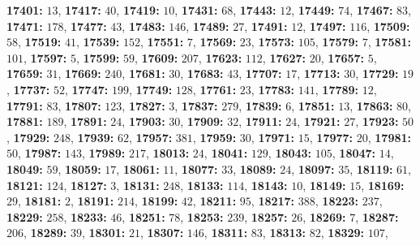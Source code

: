 \textsf{\bfseries 17401:} $13$, \textsf{\bfseries 17417:} $40$, \textsf{\bfseries 17419:} $10$, \textsf{\bfseries 17431:} $68$, \textsf{\bfseries 17443:} $12$, \textsf{\bfseries 17449:} $74$, \textsf{\bfseries 17467:} $83$, \textsf{\bfseries 17471:} $178$, \textsf{\bfseries 17477:} $43$, \textsf{\bfseries 17483:} $146$, \textsf{\bfseries 17489:} $27$, \textsf{\bfseries 17491:} $12$, \textsf{\bfseries 17497:} $116$, \textsf{\bfseries 17509:} $58$, \textsf{\bfseries 17519:} $41$, \textsf{\bfseries 17539:} $152$, \textsf{\bfseries 17551:} $7$, \textsf{\bfseries 17569:} $23$, \textsf{\bfseries 17573:} $105$, \textsf{\bfseries 17579:} $7$, \textsf{\bfseries 17581:} $101$, \textsf{\bfseries 17597:} $5$, \textsf{\bfseries 17599:} $59$, \textsf{\bfseries 17609:} $207$, \textsf{\bfseries 17623:} $112$, \textsf{\bfseries 17627:} $20$, \textsf{\bfseries 17657:} $5$, \textsf{\bfseries 17659:} $31$, \textsf{\bfseries 17669:} $240$, \textsf{\bfseries 17681:} $30$, \textsf{\bfseries 17683:} $43$, \textsf{\bfseries 17707:} $17$, \textsf{\bfseries 17713:} $30$, \textsf{\bfseries 17729:} $19$, \textsf{\bfseries 17737:} $52$, \textsf{\bfseries 17747:} $199$, \textsf{\bfseries 17749:} $128$, \textsf{\bfseries 17761:} $23$, \textsf{\bfseries 17783:} $141$, \textsf{\bfseries 17789:} $12$, \textsf{\bfseries 17791:} $83$, \textsf{\bfseries 17807:} $123$, \textsf{\bfseries 17827:} $3$, \textsf{\bfseries 17837:} $279$, \textsf{\bfseries 17839:} $6$, \textsf{\bfseries 17851:} $13$, \textsf{\bfseries 17863:} $80$, \textsf{\bfseries 17881:} $189$, \textsf{\bfseries 17891:} $24$, \textsf{\bfseries 17903:} $30$, \textsf{\bfseries 17909:} $32$, \textsf{\bfseries 17911:} $24$, \textsf{\bfseries 17921:} $27$, \textsf{\bfseries 17923:} $50$, \textsf{\bfseries 17929:} $248$, \textsf{\bfseries 17939:} $62$, \textsf{\bfseries 17957:} $381$, \textsf{\bfseries 17959:} $30$, \textsf{\bfseries 17971:} $15$, \textsf{\bfseries 17977:} $20$, \textsf{\bfseries 17981:} $50$, \textsf{\bfseries 17987:} $143$, \textsf{\bfseries 17989:} $217$, \textsf{\bfseries 18013:} $24$, \textsf{\bfseries 18041:} $129$, \textsf{\bfseries 18043:} $105$, \textsf{\bfseries 18047:} $14$, \textsf{\bfseries 18049:} $59$, \textsf{\bfseries 18059:} $17$, \textsf{\bfseries 18061:} $11$, \textsf{\bfseries 18077:} $33$, \textsf{\bfseries 18089:} $24$, \textsf{\bfseries 18097:} $35$, \textsf{\bfseries 18119:} $61$, \textsf{\bfseries 18121:} $124$, \textsf{\bfseries 18127:} $3$, \textsf{\bfseries 18131:} $248$, \textsf{\bfseries 18133:} $114$, \textsf{\bfseries 18143:} $10$, \textsf{\bfseries 18149:} $15$, \textsf{\bfseries 18169:} $29$, \textsf{\bfseries 18181:} $2$, \textsf{\bfseries 18191:} $214$, \textsf{\bfseries 18199:} $42$, \textsf{\bfseries 18211:} $95$, \textsf{\bfseries 18217:} $388$, \textsf{\bfseries 18223:} $237$, \textsf{\bfseries 18229:} $258$, \textsf{\bfseries 18233:} $46$, \textsf{\bfseries 18251:} $78$, \textsf{\bfseries 18253:} $239$, \textsf{\bfseries 18257:} $26$, \textsf{\bfseries 18269:} $7$, \textsf{\bfseries 18287:} $206$, \textsf{\bfseries 18289:} $39$, \textsf{\bfseries 18301:} $21$, \textsf{\bfseries 18307:} $146$, \textsf{\bfseries 18311:} $83$, \textsf{\bfseries 18313:} $82$, \textsf{\bfseries 18329:} $107$, 
